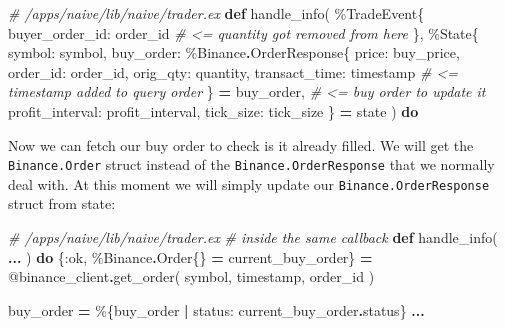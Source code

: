 \documentclass[
  oneside]{book}
\newenvironment{Shaded}{\begin{snugshade}}{\end{snugshade}}
\newcommand{\CommentTok}[1]{\textcolor[rgb]{0.56,0.35,0.01}{\textit{#1}}}
\newcommand{\ConstantTok}[1]{\textcolor[rgb]{0.00,0.00,0.00}{#1}}
\newcommand{\KeywordTok}[1]{\textcolor[rgb]{0.13,0.29,0.53}{\textbf{#1}}}
\newcommand{\NormalTok}[1]{#1}
\newcommand{\OperatorTok}[1]{\textcolor[rgb]{0.81,0.36,0.00}{\textbf{#1}}}
\newcommand{\OtherTok}[1]{\textcolor[rgb]{0.56,0.35,0.01}{#1}}
\newcommand{\VariableTok}[1]{\textcolor[rgb]{0.00,0.00,0.00}{#1}}
\begin{document}
\begin{Shaded}
\begin{Highlighting}[]
  \CommentTok{\# /apps/naive/lib/naive/trader.ex}
  \KeywordTok{def}\NormalTok{ handle\_info(}
\NormalTok{        \%}\ConstantTok{TradeEvent}\NormalTok{\{}
          \VariableTok{buyer\_order\_id:}\NormalTok{ order\_id }\CommentTok{\# \textless{}= quantity got removed from here}
\NormalTok{        \},}
\NormalTok{        \%}\ConstantTok{State}\NormalTok{\{}
          \VariableTok{symbol:}\NormalTok{ symbol,}
          \VariableTok{buy\_order:}
\NormalTok{            \%}\ConstantTok{Binance}\OperatorTok{.}\ConstantTok{OrderResponse}\NormalTok{\{}
              \VariableTok{price:}\NormalTok{ buy\_price,}
              \VariableTok{order\_id:}\NormalTok{ order\_id,}
              \VariableTok{orig\_qty:}\NormalTok{ quantity,}
              \VariableTok{transact\_time:}\NormalTok{ timestamp }\CommentTok{\# \textless{}= timestamp added to query order}
\NormalTok{            \} }\OperatorTok{=}\NormalTok{ buy\_order, }\CommentTok{\# \textless{}= buy order to update it}
          \VariableTok{profit\_interval:}\NormalTok{ profit\_interval,}
          \VariableTok{tick\_size:}\NormalTok{ tick\_size}
\NormalTok{        \} }\OperatorTok{=}\NormalTok{ state}
\NormalTok{      ) }\KeywordTok{do}
\end{Highlighting}
\end{Shaded}

Now we can fetch our buy order to check is it already filled. We will get the \texttt{Binance.Order} struct instead of the \texttt{Binance.OrderResponse} that we normally deal with. At this moment we will simply update our \texttt{Binance.OrderResponse} struct from state:

\begin{Shaded}
\begin{Highlighting}[]
  \CommentTok{\# /apps/naive/lib/naive/trader.ex}
  \CommentTok{\# inside the same callback}
  \KeywordTok{def}\NormalTok{ handle\_info(}
      \OperatorTok{...}
\NormalTok{      ) }\KeywordTok{do}
\NormalTok{    \{}\VariableTok{:ok}\NormalTok{, \%}\ConstantTok{Binance}\OperatorTok{.}\ConstantTok{Order}\NormalTok{\{\} }\OperatorTok{=}\NormalTok{ current\_buy\_order\} }\OperatorTok{=}
      \OtherTok{@binance\_client}\OperatorTok{.}\NormalTok{get\_order(}
\NormalTok{        symbol,}
\NormalTok{        timestamp,}
\NormalTok{        order\_id}
\NormalTok{      )}
    
\NormalTok{    buy\_order }\OperatorTok{=}\NormalTok{ \%\{buy\_order }\OperatorTok{|} \VariableTok{status:}\NormalTok{ current\_buy\_order}\OperatorTok{.}\NormalTok{status\}}
    \OperatorTok{...}
\end{Highlighting}
\end{Shaded}
\end{document}
